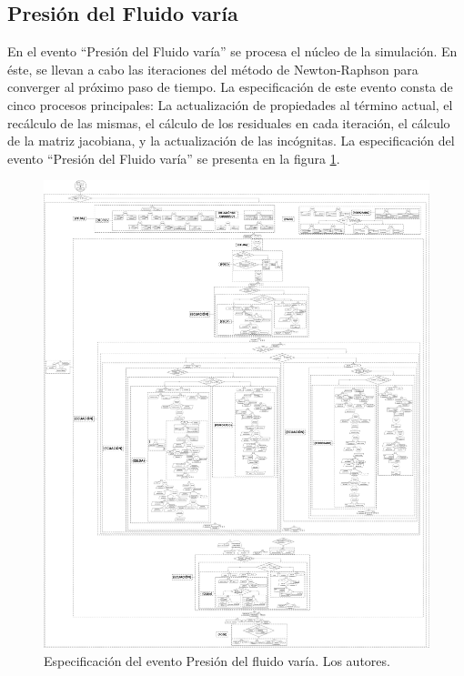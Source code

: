 \subsection{Presión del Fluido varía}\label{sec:PS_FluidVaries}
En el evento ``Presión del Fluido varía'' se procesa el núcleo de la simulación. En éste, se llevan a cabo las iteraciones del método de Newton-Raphson para converger al próximo paso de tiempo. La especificación de este evento consta de cinco procesos principales: La actualización de propiedades al término actual, el recálculo de las mismas, el cálculo de los residuales en cada iteración, el cálculo de la matriz jacobiana, y la actualización de las incógnitas. La especificación del evento ``Presión del Fluido varía'' se presenta en la figura \ref{fig:FluidPressureVaries}.\\

\begin{figure}[h]
	\centering%
	\includegraphics[width=0.9\linewidth]{Fig/PresionVaria.pdf}%
	\caption[Especificación del evento Presión del fluido varía.]{Especificación del evento Presión del fluido varía. Los autores.} \label{fig:FluidPressureVaries}
\end{figure}

